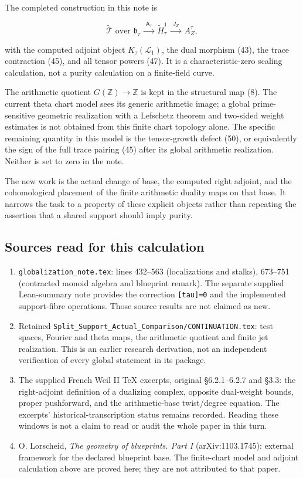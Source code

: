 \documentclass[
]{article}
\providecommand{\tightlist}{%
  \setlength{\itemsep}{0pt}\setlength{\parskip}{0pt}}
\begin{document}
The completed construction in this note is

\[
\widetilde{\mathcal T}\text{ over }\mathfrak b_\tau
\ \xrightarrow{\ \mathsf A_\tau\ }\
\widetilde H^1_\tau
\ \xrightarrow{\ J_Z\ }\
A_Z^\tau,
\]

with the computed adjoint object \(K_\tau(\mathcal L_1)\), the dual
morphism (43), the trace contraction (45), and all tensor powers (47).
It is a characteristic-zero scaling calculation, not a purity
calculation on a finite-field curve.

The arithmetic quotient \(G(\mathbb Z)\to\mathbb Z\) is kept in the
structural map (8). The current theta chart model sees its generic
arithmetic image; a global prime-sensitive geometric realization with a
Lefschetz theorem and two-sided weight estimates is not obtained from
this finite chart topology alone. The specific remaining quantity in
this model is the tensor-growth defect (50), or equivalently the sign of
the full trace pairing (45) after its global arithmetic realization.
Neither is set to zero in the note.

The new work is the actual change of base, the computed right adjoint,
and the cohomological placement of the finite arithmetic duality maps on
that base. It narrows the task to a property of these explicit objects
rather than repeating the assertion that a shared support should imply
purity.

\subsection{Sources read for this
calculation}\label{sources-read-for-this-calculation}

\begin{enumerate}
\def\labelenumi{\arabic{enumi}.}
\tightlist
\item
  \texttt{globalization\_note.tex}: lines 432--563 (localizations and
  stalks), 673--751 (contracted monoid algebra and blueprint remark).
  The separate supplied Lean-summary note provides the correction
  \texttt{{[}tau{]}=0} and the implemented support-fibre operations.
  Those source results are not claimed as new.
\item
  Retained \texttt{Split\_Support\_Actual\_Comparison/CONTINUATION.tex}:
  test spaces, Fourier and theta maps, the arithmetic quotient and
  finite jet realization. This is an earlier research derivation, not an
  independent verification of every global statement in its package.
\item
  The supplied French Weil II TeX excerpts, original §6.2.1--6.2.7 and
  §3.3: the right-adjoint definition of a dualizing complex, opposite
  dual-weight bounds, proper pushforward, and the arithmetic-base
  twist/degree equation. The excerpts' historical-transcription status
  remains recorded. Reading these windows is not a claim to read or
  audit the whole paper in this turn.
\item
  O. Lorscheid, \emph{The geometry of blueprints. Part I}
  (arXiv:1103.1745): external framework for the declared blueprint base.
  The finite-chart model and adjoint calculation above are proved here;
  they are not attributed to that paper.
\end{enumerate}
\end{document}
